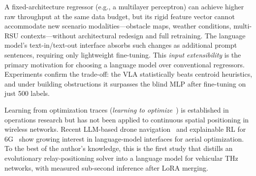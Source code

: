 \documentclass[journal]{IEEEtran}
\begin{document}
A fixed-architecture regressor (e.g., a multilayer perceptron) can achieve higher raw throughput at the same data budget, but its rigid feature vector cannot accommodate new scenario modalities---obstacle maps, weather conditions, multi-RSU contexts---without architectural redesign and full retraining. The language model's text-in/text-out interface absorbs such changes as additional prompt sentences, requiring only lightweight fine-tuning. This \emph{input extensibility} is the primary motivation for choosing a language model over conventional regressors. Experiments confirm the trade-off: the VLA statistically beats centroid heuristics, and under building obstructions it surpasses the blind MLP after fine-tuning on just 500 labels.

Learning from optimization traces (\emph{learning to optimize}~\cite{bengio2021}) is established in operations research but has not been applied to continuous spatial positioning in wireless networks. Recent LLM-based drone navigation~\cite{khan2025llmnav} and explainable RL for 6G~\cite{aranacatania2025xdrl} show growing interest in language-model interfaces for aerial optimization. To the best of the author's knowledge, this is the first study that distills an evolutionary relay-positioning solver into a language model for vehicular THz networks, with measured sub-second inference after LoRA merging.
\end{document}
